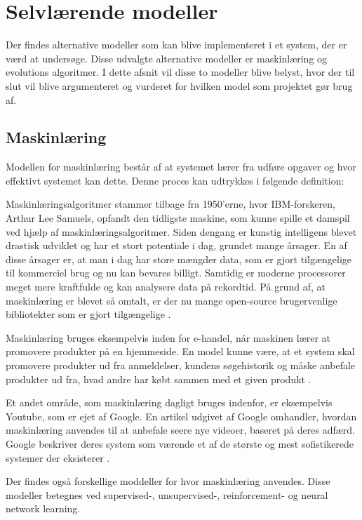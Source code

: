 \section{Selvlærende modeller}
Der findes alternative modeller som kan blive implementeret i et system, der er værd at undersøge. Disse udvalgte alternative modeller er maskinlæring og evolutions algoritmer. I dette afsnit vil disse to modeller blive belyst, hvor der til slut vil blive argumenteret og vurderet for hvilken model som projektet gør brug af.
 
\subsection{Maskinlæring}
Modellen for maskinlæring består af at systemet lærer fra udføre opgaver og hvor effektivt systemet kan dette. Denne proces kan udtrykkes i følgende definition:

 \citep{Mitchell1997}

Maskinlæringsalgoritmer stammer tilbage fra 1950'erne, hvor IBM-forskeren, Arthur Lee Samuels, opfandt den tidligste maskine, som kunne spille et damspil ved hjælp af maskinlæringsalgoritmer. Siden dengang er kunstig intelligens blevet drastisk udviklet og har et stort potentiale i dag, grundet mange årsager. En af disse årsager er, at man i dag har store mængder data, som er gjort tilgængelige til kommerciel brug og nu kan bevares billigt. Samtidig er moderne processorer meget mere kraftfulde og kan analysere data på rekordtid. På grund af, at maskinlæring er blevet så omtalt, er der nu mange open-source brugervenlige bibliotekter som er gjort tilgængelige \cite{ML1}.
\par
Maskinlæring bruges eksempelvis inden for e-handel, når maskinen lærer at promovere produkter på en hjemmeside. En model kunne være, at et system skal promovere produkter ud fra anmeldelser, kundens søgehistorik og måske anbefale produkter ud fra, hvad andre har købt sammen med et given produkt \cite{ML1}.
\par
Et andet område, som maskinlæring dagligt bruges indenfor, er eksempelvis Youtube, som er ejet af Google. En artikel udgivet af Google omhandler, hvordan maskinlæring anvendes til at anbefale seere nye videoer, baseret på deres adfærd. Google beskriver deres system som værende et af de største og mest sofistikerede systemer der eksisterer \cite{ML2}.
\par
Der findes også forskellige moddeller for hvor maskinlæring anvendes. Disse modeller betegnes ved supervised-, unsupervised-, reinforcement- og neural network learning.

